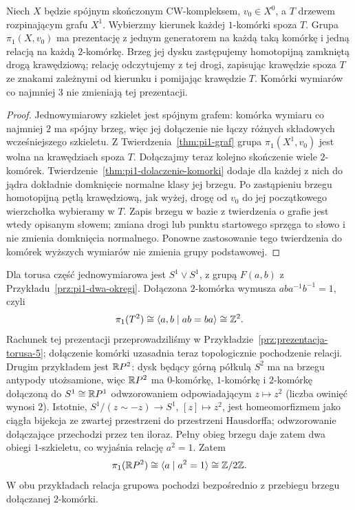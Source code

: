 \begin{wniosek}
\label{wn:pi1-cw-prezentacja}
Niech $X$ będzie spójnym skończonym CW-kompleksem,
$v_0\in X^0$, a $T$ drzewem rozpinającym grafu $X^1$.
Wybierzmy kierunek każdej $1$-komórki spoza $T$.
Grupa $\pi_1(X,v_0)$ ma prezentację z jednym generatorem
na każdą taką komórkę i jedną relacją na każdą
$2$-komórkę. Brzeg jej dysku zastępujemy homotopijną
zamkniętą drogą krawędziową; relację odczytujemy z tej
drogi, zapisując krawędzie spoza $T$ ze znakami zależnymi
od kierunku i pomijając krawędzie $T$. Komórki wymiarów
co najmniej $3$ nie zmieniają tej prezentacji.
\end{wniosek}
\begin{proof}
Jednowymiarowy szkielet jest spójnym grafem: komórka
wymiaru co najmniej $2$ ma spójny brzeg, więc jej
dołączenie nie łączy różnych składowych wcześniejszego
szkieletu. Z Twierdzenia~\ref{thm:pi1-graf} grupa
$\pi_1(X^1,v_0)$ jest wolna na krawędziach spoza $T$.
Dołączajmy teraz kolejno skończenie wiele $2$-komórek.
Twierdzenie~\ref{thm:pi1-dolaczenie-komorki} dodaje dla
każdej z nich do jądra dokładnie domknięcie normalne
klasy jej brzegu. Po zastąpieniu brzegu homotopijną
pętlą krawędziową, jak wyżej, drogę od $v_0$ do jej
początkowego wierzchołka wybieramy w $T$. Zapis brzegu
w bazie z twierdzenia o grafie jest wtedy opisanym słowem;
zmiana drogi lub punktu startowego sprzęga to słowo i
nie zmienia domknięcia normalnego. Ponowne zastosowanie
tego twierdzenia do komórek wyższych wymiarów
nie zmienia grupy podstawowej.
\end{proof}

\begin{przyklad}
\label{prz:pi1-torus-rp2}
Dla torusa część jednowymiarowa
jest $S^1\vee S^1$, z grupą
$F(a,b)$ z Przykładu~\ref{prz:pi1-dwa-okregi}.
Dołączona $2$-komórka wymusza
$aba^{-1}b^{-1}=1$, czyli
\[
 \pi_1(T^2)\cong
 \langle a,b\mid ab=ba\rangle
 \cong\mathbb{Z}^2.
\]
Rachunek tej prezentacji przeprowadziliśmy w
Przykładzie~\ref{prz:prezentacja-torusa-5}; dołączenie komórki
uzasadnia teraz topologicznie pochodzenie relacji.
Drugim przykładem jest
$\mathbb{R} P^2$: dysk będący górną
półkulą $S^2$ ma na brzegu
antypody utożsamione, więc
$\mathbb{R} P^2$ ma $0$-komórkę,
      $1$-komórkę i $2$-komórkę
      dołączoną do $S^1\cong\mathbb{R} P^1$
      odwzorowaniem odpowiadającym
      $z\mapsto z^2$ (liczba owinięć wynosi $2$).
      Istotnie, $S^1/(z\sim-z)\to S^1$, $[z]\mapsto z^2$,
      jest homeomorfizmem jako ciągła bijekcja ze zwartej
      przestrzeni do przestrzeni Hausdorffa; odwzorowanie dołączające
      przechodzi przez ten iloraz. Pełny obieg brzegu daje zatem dwa obiegi
      $1$-szkieletu, co wyjaśnia relację $a^2=1$.
      Zatem
\[
 \pi_1(\mathbb{R} P^2)
 \cong\langle a\mid a^2=1\rangle
 \cong\mathbb{Z}/2\mathbb{Z}.
\]
W obu przykładach relacja grupowa pochodzi bezpośrednio
z przebiegu brzegu dołączanej $2$-komórki.
\end{przyklad}

